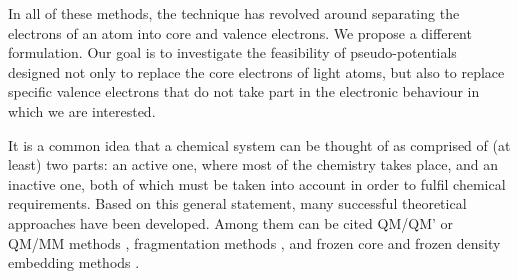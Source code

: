 \documentclass[12pt]{article}
\begin{document}
In all of these methods, the technique has revolved around separating the electrons of an atom into core and valence electrons. We propose a different formulation. Our goal is to investigate the feasibility of pseudo-potentials designed not only to replace the core electrons of light atoms, but also to replace specific valence electrons that do not take part in the electronic behaviour in which we are interested.

It is a common idea that a chemical system can be thought of as comprised of (at least) 
two parts:
an active one, where most of the chemistry takes place, and an inactive one, both of which must be taken into account in order to fulfil chemical requirements.
Based on this general statement, many successful theoretical approaches have been developed. Among them can be cited QM/QM' or QM/MM methods \cite{chung_oniom_2015,
ihrig_specific_2011,
zhang_pseudobond_1998,
dilabio_simple_2002,
dilabio_efficient_2005,
gao_generalized_1998,
assfeld_quantum_1996,
jacob_calculation_2006,
von_lilienfeld_variational_2004,
von_lilienfeld_performance_2005,
von_lilienfeld_optimization_2004,
goedecker_separable_1996,
hartwigsen_relativistic_1998,
singh_combined_1986,
zhang_pseudobond_1998-1,
zhang_improved_2004,
parks_pseudobond_2008,
dilabio_simple_2002-1,
hitzenberger_optimizing_2016,
hitzenberger_probing_2015,
collins_energy-based_2015,
pezeshki_recent_2015,
von_lilienfeld_force_2013}, 
fragmentation methods 
\cite{gordon_effective_2001,
steinmann_effective_2012}, and frozen core and frozen density embedding methods \cite{ASSFELD1996100, wesolowski_frozen-density_2015}.
  
\end{document}
